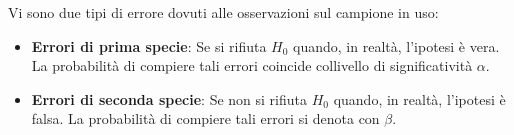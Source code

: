 \documentclass[12pt]{article}
\begin{document}
    Vi sono due tipi di errore dovuti alle osservazioni sul campione in uso: 
    \begin{itemize}
        \item \textbf{Errori di prima specie}: Se si rifiuta $H_0$ quando, in realtà, l’ipotesi è vera. La probabilità di compiere tali errori coincide collivello  di  significatività $\alpha$.
        \item \textbf{Errori di seconda specie}: Se non si rifiuta $H_0$ quando, in realtà, l’ipotesi è falsa. La probabilità di compiere tali errori si denota con $\beta$.
    \end{itemize}
\end{document}
